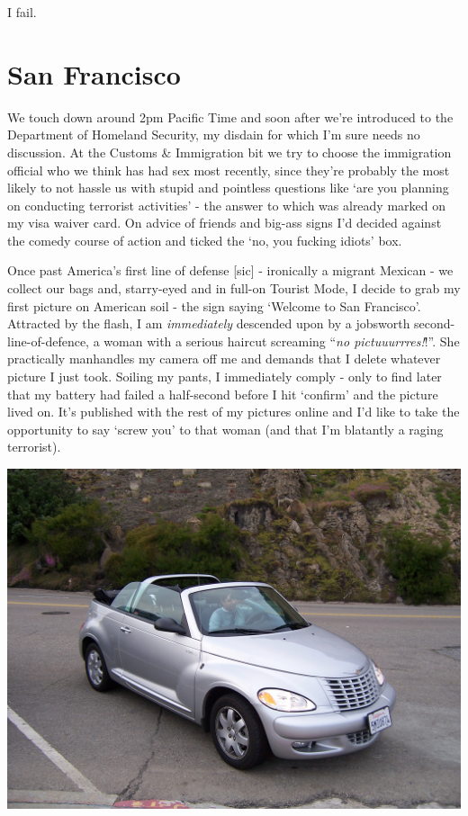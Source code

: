 \documentclass[a5paper,titlepage,11pt,draft]{book}
\begin{document}
I fail.

\section*{San Francisco}
We touch down around 2pm Pacific Time and soon after we're introduced to the Department of Homeland Security, my disdain for which I'm sure needs no discussion.  At the Customs \& Immigration bit we try to choose the immigration official who we think has had sex most recently, since they're probably the most likely to not hassle us with stupid and pointless questions like `are you planning on conducting terrorist activities' - the answer to which was already marked on my visa waiver card.  On advice of friends and big-ass signs I'd decided against the comedy course of action and ticked the `no, you fucking idiots' box.

Once past America's first line of defense [sic] - ironically a migrant Mexican - we collect our bags and, starry-eyed and in full-on Tourist Mode, I decide to grab my first picture on American soil - the sign saying `Welcome to San Francisco'.  Attracted by the flash, I am \emph{immediately} descended upon by a jobsworth second-line-of-defence, a woman with a serious haircut screaming ``\emph{no pictuuurrres!}!''.  She practically manhandles my camera off me and demands that I delete whatever picture I just took. Soiling my pants, I immediately comply - only to find later that my battery had failed a half-second before I hit `confirm' and the picture lived on.  It's published with the rest of my pictures online and I'd like to take the opportunity to say `screw you' to that woman (and that I'm blatantly a raging terrorist).

\begin{center}\includegraphics[width=\textwidth]{gfx/100_1064}\end{center}
\end{document}
